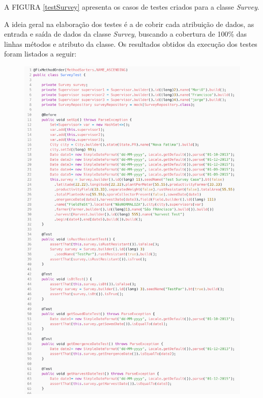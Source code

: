 A FIGURA \ref{testSurvey} apresenta os casos de testes criados para a classe \textit{Survey}. 


A ideia geral na elaboração dos testes é a de cobrir cada atribuição de dados, as entrada e saída de dados da classe \textit{Survey}, buscando a cobertura de 100\% das linhas métodos e atributo da classe. Os resultados obtidos da execução dos testes foram listados a seguir:



\begin{figure}[H]
	\centering
	\includegraphics[scale=0.17]{dados/figuras/buildSurvey.png}
\end{figure}

